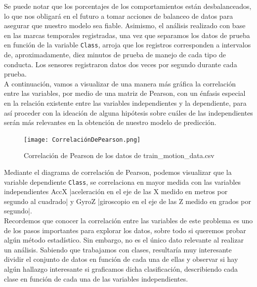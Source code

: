 \documentclass[spanish,12pt,letterpaper]{article}
\begin{document}
Se puede notar que los porcentajes de los comportamientos están desbalanceados, lo que nos obligará en el futuro a tomar acciones de balanceo de datos para asegurar que nuestro modelo sea fiable. Asimismo, el análisis realizado con base en las marcas temporales registradas, una vez que separamos los datos de prueba en función de la variable \verb|Class|, arroja que los registros corresponden a intervalos de, aproximadamente, diez minutos de prueba de manejo de cada tipo de conducta. Los sensores registraron datos dos veces por segundo durante cada prueba. \\

\textsc A continuación, vamos a visualizar de una manera más gráfica la correlación entre las variables, por medio de una matriz de Pearson, con un énfasis especial en la relación existente entre las variables independientes y la dependiente, para así proceder con la ideación de alguna hipótesis sobre cuáles de las independientes serán más relevantes en la obtención de nuestro modelo de predicción. \\

    \begin{figure}[htb]
        \centering
        \texttt{[image: CorrelaciónDePearson.png]}
        \caption{Correlación de Pearson de los datos de train\_motion\_data.csv}
        \label{fig:comand}%
    \end{figure}

\textsc Mediante el diagrama de correlación de Pearson, podemos visualizar que la variable dependiente \verb|Class|, se correlaciona en mayor medida con las variables independientes AccX |aceleración en el eje de las X medido en metros por segundo al cuadrado| y GyroZ |giroscopio en el eje de las Z medido en grados por segundo|. \\

\textsc Recordemos que conocer la correlación entre las variables de este problema es uno de los pasos importantes para explorar los datos, sobre todo si queremos probar algún método estadístico. Sin embargo, no es el único dato relevante al realizar un análisis. Sabiendo que trabajamos con clases, resultaría muy interesante dividir el conjunto de datos en función de cada una de ellas y observar si hay algún hallazgo interesante si graficamos dicha clasificación, describiendo cada clase en función de cada una de las variables independientes.  \\
\end{document}
